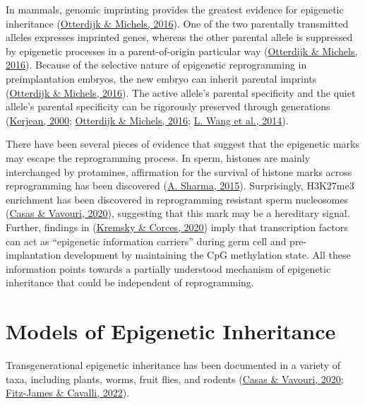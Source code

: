 \documentclass[12pt,twoside]{reedthesis}
\begin{document}
In mammals, genomic imprinting provides the greatest evidence for
epigenetic inheritance (\protect\hyperlink{ref-otterdijk2016}{Otterdijk \& Michels, 2016}). One of the two parentally
transmitted alleles expresses imprinted genes, whereas the other
parental allele is suppressed by epigenetic processes in a
parent-of-origin particular way (\protect\hyperlink{ref-otterdijk2016}{Otterdijk \& Michels, 2016}). Because of the
selective nature of epigenetic reprogramming in preimplantation embryos,
the new embryo can inherit parental imprints (\protect\hyperlink{ref-otterdijk2016}{Otterdijk \& Michels, 2016}). The
active allele's parental specificity and the quiet allele's parental
specificity can be rigorously preserved through generations
(\protect\hyperlink{ref-kerjean2000}{Kerjean, 2000}; \protect\hyperlink{ref-otterdijk2016}{Otterdijk \& Michels, 2016}; \protect\hyperlink{ref-wang2014}{L. Wang et al., 2014}).

There have been several pieces of evidence that suggest that the
epigenetic marks may escape the reprogramming process. In sperm,
histones are mainly interchanged by protamines, affirmation for the
survival of histone marks across reprogramming has been discovered
(\protect\hyperlink{ref-sharma2015}{A. Sharma, 2015}). Surprisingly, H3K27me3 enrichment has been discovered in
reprogramming resistant sperm nucleosomes (\protect\hyperlink{ref-casas2020}{Casas \& Vavouri, 2020}), suggesting that
this mark may be a hereditary signal. Further, findings in
(\protect\hyperlink{ref-kremsky2020}{Kremsky \& Corces, 2020}) imply that transcription factors can act as ``epigenetic
information carriers'' during germ cell and pre-implantation development
by maintaining the CpG methylation state. All these information points
towards a partially understood mechanism of epigenetic inheritance that
could be independent of reprogramming.

\hypertarget{models-of-epigenetic-inheritance}{%
\section*{Models of Epigenetic Inheritance}\label{models-of-epigenetic-inheritance}}

Transgenerational epigenetic inheritance has been documented in a
variety of taxa, including plants, worms, fruit flies, and rodents
(\protect\hyperlink{ref-casas2020}{Casas \& Vavouri, 2020}; \protect\hyperlink{ref-fitz-james2022}{Fitz-James \& Cavalli, 2022}).
\end{document}
